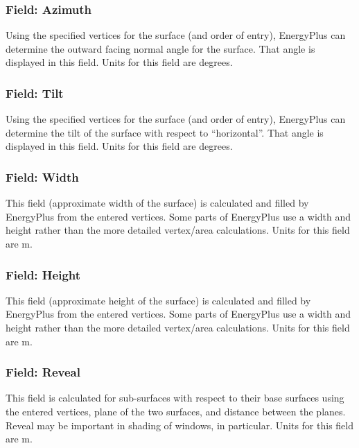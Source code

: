 \subsubsection{Field: Azimuth}\label{field-azimuth}

Using the specified vertices for the surface (and order of entry), EnergyPlus can determine the outward facing normal angle for the surface. That angle is displayed in this field. Units for this field are degrees.

\subsubsection{Field: Tilt}\label{field-tilt}

Using the specified vertices for the surface (and order of entry), EnergyPlus can determine the tilt of the surface with respect to ``horizontal''. That angle is displayed in this field. Units for this field are degrees.

\subsubsection{Field: Width}\label{field-width}

This field (approximate width of the surface) is calculated and filled by EnergyPlus from the entered vertices. Some parts of EnergyPlus use a width and height rather than the more detailed vertex/area calculations. Units for this field are m.

\subsubsection{Field: Height}\label{field-height}

This field (approximate height of the surface) is calculated and filled by EnergyPlus from the entered vertices. Some parts of EnergyPlus use a width and height rather than the more detailed vertex/area calculations. Units for this field are m.

\subsubsection{Field: Reveal}\label{field-reveal}

This field is calculated for sub-surfaces with respect to their base surfaces using the entered vertices, plane of the two surfaces, and distance between the planes. Reveal may be important in shading of windows, in particular. Units for this field are m.


